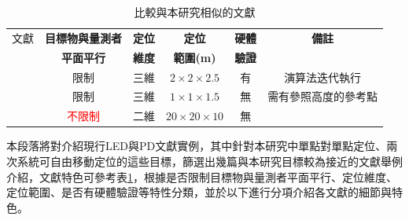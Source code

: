     \begin{table}[htpb]
        \begin{center}
          \caption{比較與本研究相似的文獻}
          \label{tab:LEDPD_case}
          \begin{tabular}{c||c|c|c|c|c} 

             文獻 &
              \textbf{目標物與量測者}&
              \textbf{定位}&
              \textbf{定位}& 
              \textbf{硬體}&
              \textbf{備註}\\

             & \textbf{平面平行}&\textbf{維度}&\textbf{範圍(m)}&\textbf{驗證} &\\
            \hline
            
            
            \cite{case:3d_layers}&
            限制&
            三維&
            $2\times 2\times 2.5$&
            有&
            演算法迭代執行\\
            
            \cite{case:cart3d}&
            限制&
            三維&
            $1\times 1\times 1.5$&
            無&
            需有參照高度的參考點\\

            \cite{omg_new}&
            \textcolor{red}{不限制}&
            二維&
            $20\times 20\times 10$&
            無&
            \\
          \end{tabular}
        \end{center}
      \end{table}

      本段落將對介紹現行LED與PD文獻實例，其中針對本研究中單點對單點定位、兩次系統可自由移動定位的這些目標，篩選出幾篇與本研究目標較為接近的文獻舉例介紹，文獻特色可參考表\ref{tab:LEDPD_case}，根據是否限制目標物與量測者平面平行、定位維度、定位範圍、是否有硬體驗證等特性分類，並於以下進行分項介紹各文獻的細節與特色。

